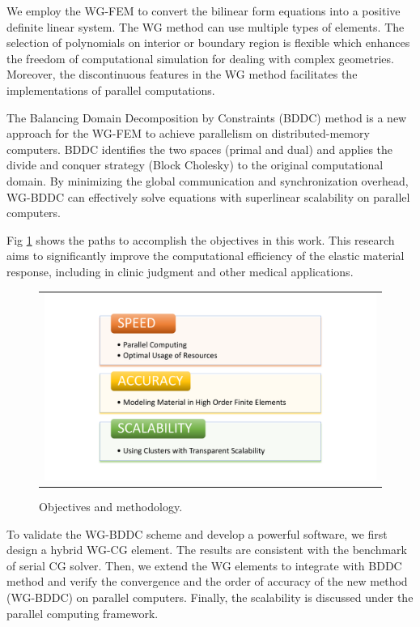 We employ the WG-FEM to convert the bilinear form equations into a positive definite linear system. The WG method can use multiple types of elements. The selection of polynomials on interior or boundary region is flexible which enhances the freedom of computational simulation for dealing with complex geometries. Moreover, the discontinuous features in the WG method facilitates the implementations of parallel computations.

The Balancing Domain Decomposition by Constraints (BDDC) method is a new approach for the WG-FEM to achieve parallelism on distributed-memory computers. BDDC identifies the two spaces (primal and dual) and applies the divide and conquer strategy (Block Cholesky) to the original computational domain. By minimizing the global communication and synchronization overhead,  WG-BDDC can effectively solve equations with superlinear scalability on parallel computers.

 Fig \ref{fig: ch1p4} shows the paths to accomplish the objectives in this work. This research aims to significantly improve the computational efficiency of the elastic material response, including in clinic judgment and other medical applications.

\begin{figure}[H]
	\centering
	\begin{tabular}{c}
		\includegraphics[width=1.0\textwidth]{./pics/ch1p4}
	\end{tabular}
	\caption{\footnotesize Objectives and methodology.} \label{fig: ch1p4}
\end{figure}

To validate the WG-BDDC scheme and develop a powerful software, we first design a hybrid WG-CG element. The results are consistent with the benchmark of serial CG solver. Then, we extend the WG elements to integrate with BDDC method and verify the convergence and the order of accuracy of the new method (WG-BDDC) on parallel computers. Finally, the scalability is discussed under the parallel computing framework.

